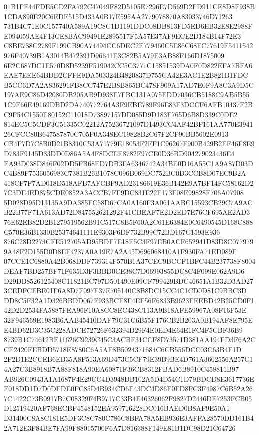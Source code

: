 \documentclass[UTF8,fontset=fandol,zihao=-4,a4paper]{ctexart}
\begin{document}
{{01B1FF44FDE5CD2FA792C47049F82D5105E7296E7D569D2FD911CE8D8F938B1CDA890E20C6EDE515D433A0B17E595AA2779078870A83033746D71263
731B4C71E0C157740A589A19C8C1D1191DDC08DB813FD5ED6EB32E8E2988FE094059AE4F13CE8BAC99491E2895517F5A57E37AF9ECE2D184B14F72E3
C8BE738C2789F199CB90A74494CC6DEC2E779460C5E86C68FC77619F5411542976F40739B1A3014B472891D96641E3C82B5A79E3AB88F166D1875009
6E2C687DC1E570D8D5239F519042CC5C3771C15851539DA0F0D822EFA7BFA6EAE7EEE64BDD2CFFE9DA503324B4820837D755CA42E3AC1E2B821B1FDC
B5CC6D7A2A836291FB8CC747E2B8B865BC478F909A17AD7E0F9A8C3A9D5C197AE9C86D42080DB205AB9D938F7FBC131A075FDD7036CB5188C9AB5B55
1C9F66E49169DBD2DA740772764A3F9EBE789F96E83F3DCCF6AFB10437F2BC9F54C1550E80152C11018D73897157DD085D9D183F765D6B8D339C0DE2
814EC5C5CDF3C51335C02212A75236721097D1493CC4AF42BF161AA770E394126CFCC80B647587870C705F0A348EC19828B2C67F2CF90BB5602E0913
CB4F7D7C8B0D21B8310C53A71779E18053F2FF1C96267F900B429B2EF46F8E9D783F9145D33DD0D86A5A4F8DCEE8782F97CE0D36BD904279023436E4
EA93D038D846F02DD5FB68ED7DB3FA6346742A34BE0D16A55C1A9A87D03DC4B89F7536056983C7381B26B1078C096B069DC752BC0D3CCB8D07EC9B2A
418CF7F7AD018D518AFB7AFCBF9AD23186619E36B142E9A7BF14FC58162D27C3DE4ED875CDE0852A3ACCB7FF9DC831E22F173F08E99828F706A07908
5D028D95D13135A9DA385FC58D67CA0A160F3A061AABC15593CB29C7A9ACB22B77F71A613AD72D847552621292F41CBEAF7E2D2ED7E76CF695AE2AD3
76E62EB82D2B1279519562B91C517C8B5F60A2C61E6384E0C6490545D168C888C570E36B1330B25374641111E9303F6DF732B99C72BD167C1593E936
876C28D2273CFE512705AD95BDF7E18E5C3F97EB0ACF652941D83D8C0779799A48F2D155D0D8EF4237A0A19E7A2A45D696068410A1F930FA71ED089F
07CCE1C6880A42B068DDF739314F570B1A37CEC9BCCF1BFC44B237738F8004DEAF7BD257BF71F635D3F3BBD0CE38C7D06993855DC8C4F099E062A9D6
D29DB8526125408C11821BC797D501490E09CF799429BDC46651A1B32D3AD273CEDFCFBE01F6A8D7F097E37E705140C8B8DC15CC4C1CD0D81C9BBC3D
DD8C5F32A1D326BBDD067F933BCE8F4EF56F6833B9623FEEBD42B25CD0F142D2D2534FA5887FEA96F10A8CC8EC438C113A9B18AFE59967A08F16F53E
32F946569E1983B6AAB45410DAF79C31C6B55F176CB2B203A0B194AF8E795EE4BD62D3C35C228ADCE72726F632394D29F4E0ED4E64E1FC4F5CBF36B9
8739B1C74612BE11626C9239C45C3ACBF31CCF8D73571D381AA194FD3F6A2CCE2420FEBDD5718E8780C6A5AF8B5024371684C6CB556DCC03C63B4F1D
2F2D1E2CCEB6EB35A8F513A69D473C5CF79E39B9BE4D761A3602556A257C14A27C3B8918B7A88F818A90EA60871F36CB8312FBAD6B8910C458811B97
AB926C0943A1A1687F4E29CC4D3948DB102A5D4D54C1D79BDCD8E3617736EF018DD1D7D0DFDE0FC85D4B934CD6E43DC4D86F0FD8FC3F4987C6B52A26
7C1422C73B0917B7C08329F4B9717C33B4F46326062F9827D2446DE7253FCB05D12519420AF768ECBF4548152EA959716228DC016BAED0B8AF9E50A1
D31400C8A8C181E5DF3C8C780C786C8BFA78A5EB936E3AFFA28570DD161B42A712E3F84BE7FA99F88015700F6A7D816388F149E81B1DC98D21C64726
}}
\end{document}
